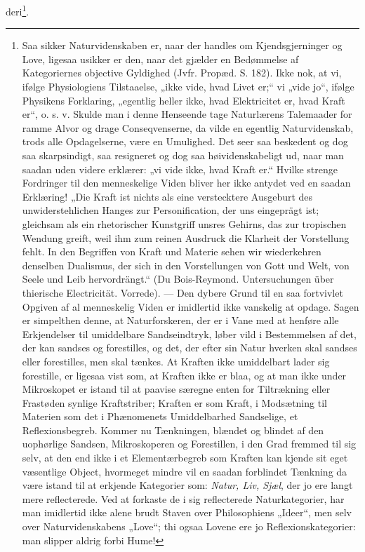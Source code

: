 \documentclass[11pt]{book}
\begin{document}
deri\footnote{%
Saa sikker Naturvidenskaben er, naar der handles om Kjendsgjerninger og
Love, ligesaa usikker er den, naar det gjælder en Bedømmelse af
Kategoriernes objective Gyldighed (Jvfr. Propæd. S. 182). Ikke nok, at
vi, ifølge Physiologiens Tilstaaelse, „ikke vide, hvad Livet er;“ vi
„vide jo“, ifølge Physikens Forklaring, „egentlig heller ikke, hvad
Elektricitet er, hvad Kraft er“, o. s. v. Skulde man i denne Henseende
tage Naturlærens Talemaader for ramme Alvor og drage Conseqvenserne, da
vilde en egentlig Naturvidenskab, trods alle Opdagelserne, være en
Umulighed. Det seer saa beskedent og dog saa skarpsindigt, saa resigneret
og dog saa høividenskabeligt ud, naar man saadan uden videre erklærer:
„vi vide ikke, hvad Kraft er.“ Hvilke strenge Fordringer til den
menneskelige Viden bliver her ikke antydet ved en saadan Erklæring! „Die
Kraft ist nichts als eine verstecktere Ausgeburt des unwiderstehlichen
Hanges zur Personification, der uns eingeprägt ist; gleichsam als ein
rhetorischer Kunstgriff unsres Gehirns, das zur tropischen Wendung
greift, weil ihm zum reinen Ausdruck die Klarheit der Vorstellung fehlt.
In den Begriffen von Kraft und Materie sehen wir wiederkehren denselben
Dualismus, der sich in den Vorstellungen von Gott und Welt, von Seele und
Leib hervordrängt.“ (Du Bois-Reymond. Untersuchungen über thierische
Electricität. Vorrede). --- Den dybere Grund til en saa fortvivlet
Opgiven af al menneskelig Viden er imidlertid ikke vanskelig at opdage.
Sagen er simpelthen denne, at Naturforskeren, der er i Vane med at
henføre alle Erkjendelser til umiddelbare Sandseindtryk, løber vild i
Bestemmelsen af det, der kan sandses og forestilles, og det, der efter
sin Natur hverken skal sandses eller forestilles, men skal tænkes. At
Kraften ikke umiddelbart lader sig forestille, er ligesaa vist som, at
Kraften ikke er blaa, og at man ikke under Mikroskopet er istand til at
paavise særegne enten for Tiltrækning eller Frastøden synlige
Kraftstriber; Kraften er som Kraft, i Modsætning til Materien som det i
Phænomenets Umiddelbarhed Sandselige, et Reflexionsbegreb. Kommer nu
Tænkningen, blændet og blindet af den uophørlige
Sandsen, Mikroskoperen og Forestillen, i den Grad fremmed til sig selv,
at den end ikke i et Elementærbegreb som Kraften kan kjende sit eget
væsentlige Object, hvormeget mindre vil en saadan forblindet Tænkning da
være istand til at erkjende Kategorier som: \emph{Natur, Liv, Sjæl}, der
jo ere langt mere reflecterede. Ved at forkaste de i sig reflecterede
Naturkategorier, har man imidlertid ikke alene brudt Staven over
Philosophiens „Ideer“, men selv over Naturvidenskabens „Love“; thi ogsaa
Lovene ere jo Reflexionskategorier: man slipper aldrig forbi Hume!
}.
\end{document}
